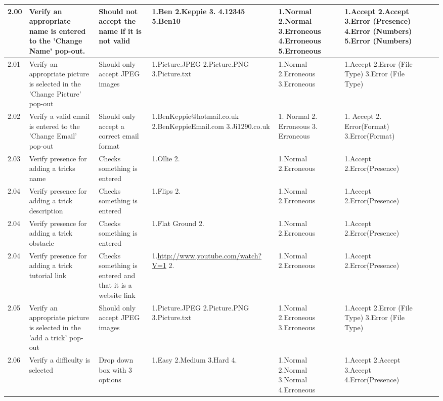 \begin{landscape}
\begin{center}
\begin{longtable}{|p{1.5cm}|p{2.5cm}|p{2.5cm}|p{2cm}|p{2cm}|p{2cm}|p{2cm}|p{2cm}|}
2.00 & Verify an appropriate name is entered to the 'Change Name' pop-out. & Should not accept the name if it is not valid & 1.Ben 2.Keppie 3.   4.12345  5.Ben10 & 1.Normal 2.Normal 3.Erroneous 4.Erroneous 5.Erroneous & 1.Accept 2.Accept 3.Error (Presence) 4.Error (Numbers) 5.Error (Numbers) & & \\ \hline

2.01 & Verify an appropriate picture is selected in the 'Change Picture' pop-out & Should only accept JPEG images & 1.Picture.JPEG 2.Picture.PNG 3.Picture.txt & 1.Normal 2.Erroneous 3.Erroneous & 1.Accept 2.Error (File Type) 3.Error (File Type) & & \\ \hline

2.02 & Verify a valid email is entered to the 'Change Email' pop-out & Should only accept a correct email format & 1.BenKeppie@hotmail.co.uk 2.BenKeppieEmail.com 3.Ji1290.co.uk & 1. Normal 2. Erroneous 3. Erroneous & 1. Accept 2. Error(Format) 3.Error(Format) & & \\ \hline

2.03 & Verify presence for adding a tricks name & Checks something is entered & 1.Ollie 2.  & 1.Normal 2.Erroneous & 1.Accept 2.Error(Presence) & & \\ \hline

2.04 & Verify presence for adding a trick description & Checks something is entered & 1.Flips 2. & 1.Normal 2.Erroneous & 1.Accept 2.Error(Presence) & & \\ \hline

2.04 & Verify presence for adding a trick obstacle & Checks something is entered & 1.Flat Ground 2. & 1.Normal 2.Erroneous & 1.Accept 2.Error(Presence) & & \\ \hline

2.04 & Verify presence for adding a trick tutorial link & Checks something is entered and that it is a website link & 1.\url{http://www.youtube.com/watch?V=1} 2. & 1.Normal 2.Erroneous & 1.Accept 2.Error(Presence) & & \\ \hline

2.05 & Verify an appropriate picture is selected in the 'add a trick' pop-out & Should only accept JPEG images & 1.Picture.JPEG 2.Picture.PNG 3.Picture.txt & 1.Normal 2.Erroneous 3.Erroneous & 1.Accept 2.Error (File Type) 3.Error (File Type) & & \\ \hline

2.06 & Verify a difficulty is selected & Drop down box with 3 options & 1.Easy 2.Medium 3.Hard 4. & 1.Normal 2.Normal 3.Normal 4.Erroneous & 1.Accept 2.Accept 3.Accept 4.Error(Presence) & & \\ \hline


\end{longtable}
\end{center}
\end{landscape}

